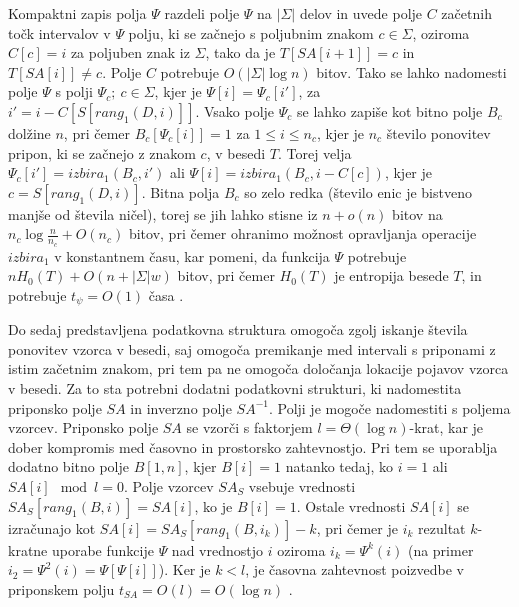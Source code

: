 Kompaktni zapis polja $\Psi$ razdeli polje $\Psi$ na $|\Sigma|$ delov in uvede polje $C$ začetnih točk intervalov v $\Psi$ polju, ki se začnejo s poljubnim znakom $c\in\Sigma$, oziroma $C[c]=i$ za poljuben znak iz $\Sigma$, tako da je $T[SA[i+1]]=c$ in $T[SA[i]]\ne c$. Polje $C$ potrebuje $O(|\Sigma|\log{n})$ bitov. Tako se lahko nadomesti polje $\Psi$ s polji $\Psi_c;\:c\in\Sigma$, kjer je $\Psi[i]=\Psi_c[i']$, za $i'=i-C[S[rang_1(D,i)]]$. Vsako polje $\Psi_c$ se lahko zapiše kot bitno polje $B_c$ dolžine $n$, pri čemer $B_c[\Psi_c[i]]=1$ za $1 \le i \le n_c$, kjer je $n_c$ število ponovitev pripon, ki se začnejo z znakom $c$, v besedi $T$. Torej velja $\Psi_c[i']=izbira_1(B_c,i')$ ali $\Psi[i]=izbira_1(B_c,i-C[c])$, kjer je $c=S[rang_1(D,i)]$. Bitna polja $B_c$ so zelo redka (število enic je bistveno manjše od števila ničel), torej se jih lahko stisne iz $n+o(n)$ bitov na $n_c\log\frac{n}{n_c}+O(n_c)$ bitov, pri čemer ohranimo možnost opravljanja operacije $\textit{izbira}_1$ v konstantnem času, kar pomeni, da funkcija $\Psi$ potrebuje $nH_0(T)+O(n+|\Sigma|w)$ bitov, pri čemer $H_0(T)$ je entropija besede $T$, in potrebuje $t_\psi=O(1)$ časa \cite{Navarro2016}.

Do sedaj predstavljena podatkovna struktura omogoča zgolj iskanje števila ponovitev vzorca v besedi, saj omogoča premikanje med intervali s priponami z istim začetnim znakom, pri tem pa ne omogoča določanja lokacije pojavov vzorca v besedi. Za to sta potrebni dodatni podatkovni strukturi, ki nadomestita priponsko polje $SA$ in inverzno polje $SA^{-1}$. Polji je mogoče nadomestiti s poljema vzorcev. Priponsko polje $SA$ se vzorči s faktorjem $l=\Theta(\log{n})$-krat, kar je dober kompromis med časovno in prostorsko zahtevnostjo. Pri tem se uporablja dodatno bitno polje $B[1,n]$, kjer $B[i]=1$ natanko tedaj, ko $i=1$ ali $SA[i]\mod{l} =0$. Polje vzorcev $SA_S$ vsebuje vrednosti $SA_S[rang_1(B,i)]=SA[i]$, ko je $B[i]=1$. Ostale vrednosti $SA[i]$ se izračunajo kot $SA[i]=SA_S[rang_1(B,i_k)]-k$, pri čemer je $i_k$ rezultat $k$-kratne uporabe funkcije $\Psi$ nad vrednostjo $i$ oziroma $i_k=\Psi^k(i)$ (na primer $i_2=\Psi^2(i)=\Psi[\Psi[i]]$). Ker je $k< l$, je časovna zahtevnost poizvedbe v priponskem polju $t_{SA}=O(l)=O(\log{n})$ \cite{Navarro2016}.

